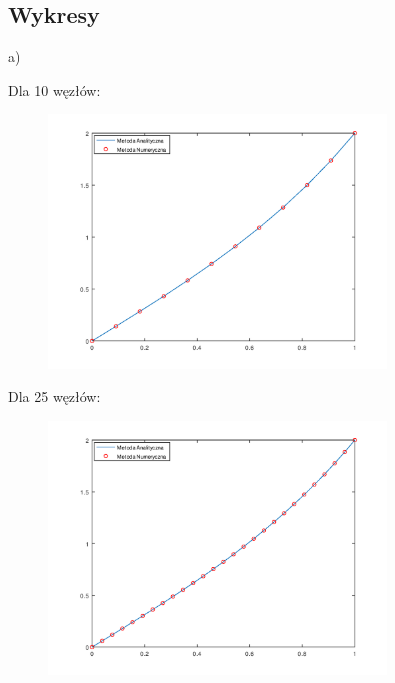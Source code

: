 \begin{samepage}
    
\end{samepage}

\newpage

\subsection{Wykresy}

a)\\
\begin{samepage}
Dla 10 węzłów:

\FloatBarrier
\begin{figure}[!ht]
    \begin{center}
        \includegraphics[width=0.8\textwidth]{Lab4/charts/zad1/zad1_n_10.png}
    \end{center}
\end{figure}
\FloatBarrier
\end{samepage}

\begin{samepage}
Dla 25 węzłów:
\begin{figure}[!ht]
    \begin{center}
\includegraphics[width=0.8\textwidth]{Lab4/charts/zad1/zad1_n_25.png}
    \end{center}
\end{figure}
\FloatBarrier
\end{samepage}

